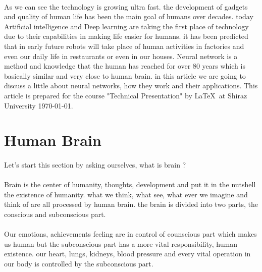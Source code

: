 \documentclass[12pt , a4paper]{article}
\newcommand{\thedate}{\today}
\begin{document}
\paragraph{} As we can see the technology is growing ultra fast. the development of gadgets and quality of human life has been the main goal of humans over decades. today Artificial intelligence and Deep learning are taking the first place of technology due to their capabilities in making life easier for humans. it has been predicted that in early future robots will take place of human activities in factories and even our daily life in restaurants or even in our houses. Neural network is a method and knowledge that the human has reached for over 80 years which is basically similar and very close to human brain. in this article we are going to discuss a little about neural networks, how they work and their applications.
This article is prepared for the course "Technical Presentation" by   \LaTeX\   at  Shiraz  University \thedate.

\cleardoublepage

\section { Human Brain } \label{sec:1}
\paragraph{} Let’s start this section by asking ourselves, what is brain ? \\
\paragraph{} Brain is the center of humanity, thoughts, development and put it in the nutshell the existence of humanity. what we think, what see, what ever we imagine and think of are all processed by human brain. the brain is divided into two parts, the conscious and subconscious part. \\
\paragraph{} Our emotions, achievements feeling are in control of counscious part which makes us human but the subconscious part has a more vital responsibility, human existence. our heart, lungs, kidneys, blood pressure and every vital operation in our body is controlled by the subconscious part.  \\
\end{document}
